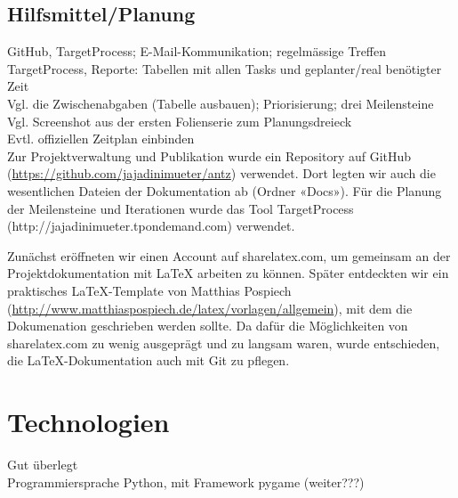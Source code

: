 \vspace*{1cm}


\subsection{Hilfsmittel/Planung}


GitHub, TargetProcess; E-Mail-Kommunikation; regelmässige Treffen \\

TargetProcess, Reporte: Tabellen mit allen Tasks und geplanter/real benötigter Zeit \\

Vgl. die Zwischenabgaben (Tabelle ausbauen); Priorisierung; drei Meilensteine \\

Vgl. Screenshot aus der ersten Folienserie zum Planungsdreieck \\



Evtl. offiziellen Zeitplan einbinden \\


Zur Projektverwaltung und Publikation wurde ein Repository auf GitHub (\url{https://github.com/jajadinimueter/antz}) verwendet. Dort legten wir auch die wesentlichen Dateien der Dokumentation ab (Ordner «Docs»). Für die Planung der Meilensteine und Iterationen wurde das Tool TargetProcess (http://jajadinimueter.tpondemand.com) verwendet.



\vspace*{1cm}

Zunächst eröffneten wir einen Account auf sharelatex.com, um gemeinsam an der Projektdokumentation mit LaTeX arbeiten zu können. Später entdeckten wir ein praktisches LaTeX-Template von Matthias Pospiech (\url{http://www.matthiaspospiech.de/latex/vorlagen/allgemein}), mit dem die Dokumenation geschrieben werden sollte. Da dafür die Möglichkeiten von sharelatex.com zu wenig ausgeprägt und zu langsam waren, wurde entschieden, die LaTeX-Dokumentation auch mit Git zu pflegen.



\vspace*{1cm}

\section{Technologien}

Gut überlegt \\

Programmiersprache Python, mit Framework pygame (weiter???)

